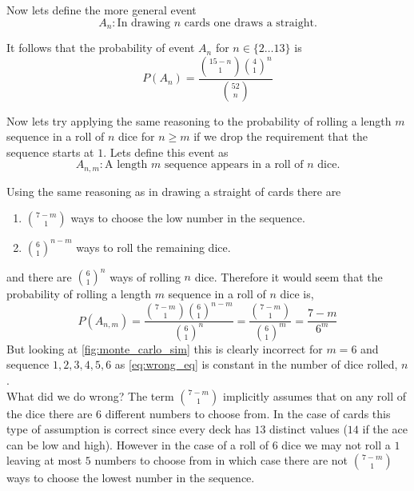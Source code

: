 \documentclass[12pt,a4paper]{article}
\begin{document}
Now lets define the more general event
\begin{equation*}
A_n: \text{In drawing $n$ cards one draws a straight.}
\end{equation*}

It follows that the probability of event $A_n$ for $n\in\{2 \ldots 13\}$ is 
\begin{equation}
P(A_n) = \frac{\binom{15-n}{1}\binom{4}{1}^n}{\binom{52}{n}}
\end{equation}

Now lets try applying the same reasoning to the probability of rolling a length $m$ sequence in a roll of $n$ dice for $n\geq m$ if we drop the requirement that the sequence starts at $1$. Lets define this event as
\begin{equation*}
A_{n,m}: \text{A length $m$ sequence appears in a roll of $n$ dice.}
\end{equation*}

Using the same reasoning as in drawing a straight of cards there are
\begin{enumerate}
\item $\binom{7-m}{1}$ ways to choose the low number in the sequence.
\item $\binom{6}{1}^{n-m}$ ways to roll the remaining dice.
\end{enumerate}
and there are $\binom{6}{1}^n$ ways of rolling $n$ dice. Therefore it would seem that the probability of rolling a length $m$ sequence in a roll of $n$ dice is,
\begin{equation}
P(A_{n,m}) = \frac{\binom{7-m}{1}\binom{6}{1}^{n-m}}{\binom{6}{1}^n} = \frac{\binom{7-m}{1}}{\binom{6}{1}^m} = \frac{7-m}{6^m}
\label{eq:wrong_eq}
\end{equation}
But looking at \cref{fig:monte_carlo_sim} this is clearly incorrect for $m=6$ and sequence $1,2,3,4,5,6$ as \cref{eq:wrong_eq} is constant in the number of dice rolled, $n$.\\

What did we do wrong? The term $\binom{7-m}{1}$ implicitly assumes that on any roll of the dice there are $6$ different numbers to choose from. In the case of cards this type of assumption is correct since every deck has $13$ distinct values ($14$ if the ace can be low and high). However in the case of a roll of $6$ dice we may not roll a $1$ leaving at most $5$ numbers to choose from in which case there are not $\binom{7-m}{1}$ ways to choose the lowest number in the sequence.\\
\end{document}
